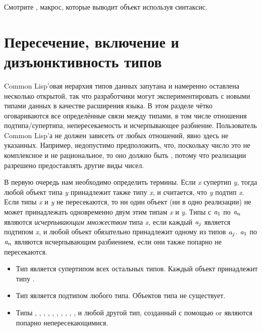 \begin{newer}
Смотрите , макрос, которые выводит объект используя
\cd{\#<} синтаксис.
\end{newer}

\section{Пересечение, включение и дизъюнктивность типов}

Common Lisp'овая иерархия типов данных запутана и намеренно оставлена несколько
открытой, так что разработчики могут экспериментировать с новыми типами данных в
качестве расширения языка. В этом разделе чётко оговариваются все
определённые связи между типами, в том числе отношения подтипа/супертипа,
непересекаемость и исчерпывающее разбиение. Пользователь Common Lisp'а
не должен зависеть от любых отношений, явно здесь не указанных.
Например, недопустимо предположить, что, поскольку число
это не комплексное и не рациональное, то оно должно быть , потому что
реализации разрешено предоставлять другие виды чисел.

В первую очередь нам необходимо определить термины.
Если \emph{x} супертип \emph{y}, тогда любой объект типа \emph{y} принадлежит
также типу \emph{x}, и считается, что \emph{y} подтип \emph{x}. Если типы
\emph{x} и \emph{y} не пересекаются, то ни один объект (ни в одно реализации) не
может принадлежать одновременно двум этим типам \emph{x} и \emph{y}. Типы
с $\emph{a}_1$ по $\emph{a}_{n}$ являются \emph{исчерпывающим множеством} типа
\emph{x}, если каждый $\emph{a}_j$ является подтипом \emph{x}, и любой объект
обязательно принадлежит одному из типов $\emph{a}_{j}$.
$\emph{a}_1$ по $\emph{a}_{n}$ являются исчерпывающим разбиением, если они также
попарно не пересекаются.

\begin{itemize}
\item
Тип  является супертипом всех остальных типов. Каждый объект принадлежит
типу .

\item 
Тип {\nil} является подтипом любого типа.
Объектов типа {\nil} не существует.
\end{itemize}

\begin{itemize}
\item
Типы , , , , ,
, , , ,
,  и любой другой тип, созданный с помощью
 or  являются попарно непересекающимися.
\end{itemize}

